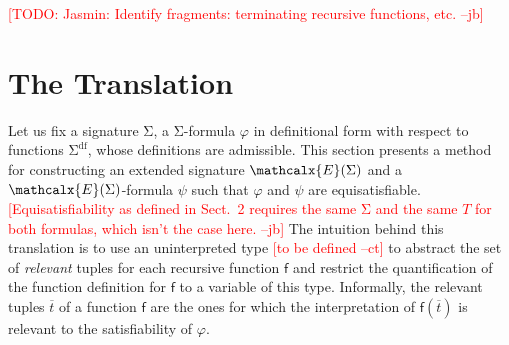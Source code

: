\documentclass[runningheads,a4paper]{llncs}
\newcommand{\con}[1]{\mathsf{#1}}
\renewcommand\vec[1]{\overline{#1}}
\let\oldSigma=\Sigma
\def\Sigma{\mathrm{\oldSigma}}
\newcommand{\teq}{\approx}
\newcommand{\sfundefs}[1]{#1^\mathrm{df}}
\newcommand{\sortint}{\mathrm{Int}}
\newcommand{\forallf}[1]{\forall_{\!#1\:}}
\newcommand{\extendsig}[1]{\mathcalx{E}( #1 )}
\newcommand{\rem}[1]{\textcolor{red}{[#1]}}
\newcommand{\jb}[1]{\rem{#1 --jb}}
\newcommand{\ct}[1]{\rem{#1 --ct}}
\begin{document}
\jb{TODO: Jasmin: Identify fragments: terminating recursive functions, etc.}


\section{The Translation}
\label{sec:encoding}

Let us fix a signature $\Sigma$, a $\Sigma$-formula
$\varphi$ in definitional form with respect to functions $\sfundefs{\Sigma}$,
whose definitions are admissible.
This section presents a method for constructing an extended signature
$\extendsig{ \Sigma }$ and a $\extendsig{ \Sigma }$-formula $\psi$ such that
$\varphi$ and $\psi$ are equisatisfiable.
\jb{Equisatisfiability as defined in Sect.\ 2 requires the same $\Sigma$ and
the same $T$ for both formulas, which isn't the case here.}
The intuition behind this translation
is to use an uninterpreted type \ct{to be defined} to abstract the set of
\emph{relevant} tuples for each recursive function $\con{f}$ and restrict the
quantification of the function definition for $\con{f}$ to a variable of this
type. Informally, the relevant tuples $\vec t$ of a function $\con{f}$ are the
ones for which the interpretation of $\con{f}( \vec t )$ is relevant to the
satisfiability of $\varphi$.
\end{document}
